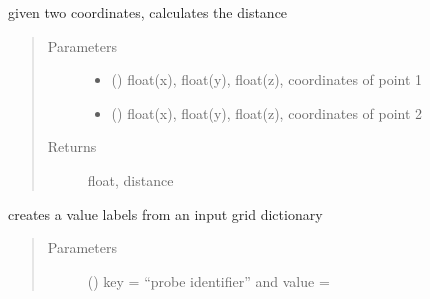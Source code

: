 \documentclass[letterpaper,10pt,english]{sphinxmanual}
\begin{document}
\begin{fulllineitems}
\begin{fulllineitems}
\begin{quote}
\begin{description}
\end{description}\end{quote}

\end{fulllineitems}


\begin{fulllineitems}
\label{\detokenize{hs_utilities_api:hotspots.hs_utilities.Helper.get_distance}}
given two coordinates, calculates the distance
\begin{quote}\begin{description}
\item[{Parameters}] \leavevmode\begin{itemize}
\item {} 
 () \textendash{} float(x), float(y), float(z), coordinates of point 1

\item {} 
 () \textendash{} float(x), float(y), float(z), coordinates of point 2

\end{itemize}

\item[{Returns}] \leavevmode
float, distance

\end{description}\end{quote}

\end{fulllineitems}


\begin{fulllineitems}
\label{\detokenize{hs_utilities_api:hotspots.hs_utilities.Helper.get_label}}
creates a value labels from an input grid dictionary
\begin{quote}\begin{description}
\item[{Parameters}] \leavevmode
{} () \textendash{} key = “probe identifier” and value = 


\end{description}
\end{quote}
\end{fulllineitems}
\end{fulllineitems}
\end{document}
